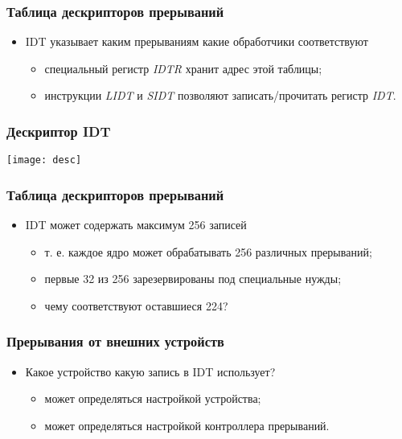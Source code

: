 \begin{frame}
\frametitle{Таблица дескрипторов прерываний}
\begin{itemize}
    \item<1-> IDT указывает каким прерываниям какие обработчики соответствуют
    \begin{itemize}
        \item<2-> специальный регистр \emph{IDTR} хранит адрес этой таблицы;
        \item<3-> инструкции \emph{LIDT} и \emph{SIDT} позволяют
        записать/прочитать регистр \emph{IDT}.
    \end{itemize}
\end{itemize}
\end{frame}

\begin{frame}
\frametitle{Дескриптор IDT}
    \hspace*{\fill}
    \texttt{[image: desc]}
    \hspace*{\fill}\hspace*{\fill}
\end{frame}

\begin{frame}
\frametitle{Таблица дескрипторов прерываний}
\begin{itemize}
    \item<1->IDT может содержать максимум 256 записей
    \begin{itemize}
        \item т. е. каждое ядро может обрабатывать 256 различных прерываний;
        \item<2-> первые 32 из 256 зарезервированы под специальные нужды;
        \item<3-> чему соответствуют оставшиеся 224?
    \end{itemize}
\end{itemize}
\end{frame}

\begin{frame}
\frametitle{Прерывания от внешних устройств}
\begin{itemize}
    \item<1->Какое устройство какую запись в IDT использует?
    \begin{itemize}
        \item<2->может определяться настройкой устройства;
        \item<3->может определяться настройкой контроллера прерываний.
    \end{itemize}
\end{itemize}
\end{frame}

